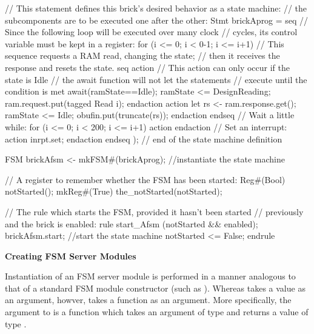 \begin{libverbatim}

   // This statement defines this brick's desired behavior as a state machine:
   // the subcomponents are to be executed one after the other:   
   Stmt brickAprog =
     seq
        // Since the following loop will be executed over many clock
        // cycles, its control variable must be kept in a register:
        for (i <= 0; i < 0-1; i <= i+1)
           // This sequence requests a RAM read, changing the state;
           // then it receives the response and resets the state.
           seq
              action
                 // This action can only occur if the state is Idle
                 // the await function will not let the statements
                 // execute until the condition is met
                 await(ramState==Idle);         
                 ramState <= DesignReading;
                 ram.request.put(tagged Read i);
              endaction
              action
                 let rs <- ram.response.get();
                 ramState <= Idle;
                 obufin.put(truncate(rs));
              endaction
           endseq
        // Wait a little while:
        for (i <= 0; i < 200; i <= i+1)
           action
           endaction
        // Set an interrupt:
        action
           inrpt.set;
        endaction
     endseq
     );
   // end of the state machine definition

   FSM brickAfsm  <-  mkFSM#(brickAprog);  //instantiate the state machine

   // A register to remember whether the FSM has been started:
   Reg#(Bool) notStarted();
   mkReg#(True) the_notStarted(notStarted);
   
   // The rule which starts the FSM, provided it hasn't been started
   // previously and the brick is enabled:
   rule start_Afsm (notStarted && enabled);
      brickAfsm.start;                //start the state machine
      notStarted <= False;
   endrule
\end{libverbatim}


{\bf Creating FSM Server Modules}

\label{sec-stmtFSMservers}

Instantiation of an FSM server module is performed in a manner
analogous to that of a standard FSM module constructor (such
as ). Whereas  takes a  value as an
argument, howver,  takes a function as an
argument. More specifically, the argument to  is a
function which takes an argument of type  and returns a value
of type .

